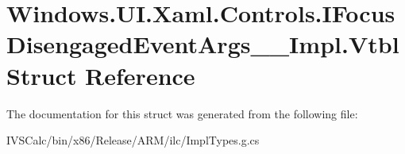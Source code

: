 \hypertarget{struct_windows_1_1_u_i_1_1_xaml_1_1_controls_1_1_i_focus_disengaged_event_args_____impl_1_1_vtbl}{}\section{Windows.\+U\+I.\+Xaml.\+Controls.\+I\+Focus\+Disengaged\+Event\+Args\+\_\+\+\_\+\+Impl.\+Vtbl Struct Reference}
\label{struct_windows_1_1_u_i_1_1_xaml_1_1_controls_1_1_i_focus_disengaged_event_args_____impl_1_1_vtbl}


The documentation for this struct was generated from the following file\+:\begin{DoxyCompactItemize}
\item 
I\+V\+S\+Calc/bin/x86/\+Release/\+A\+R\+M/ilc/Impl\+Types.\+g.\+cs\end{DoxyCompactItemize}

